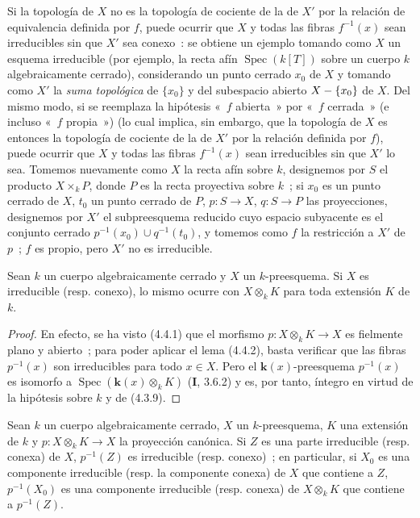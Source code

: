 \begin{remark}[4.4.3]
\label{IV.2.4.4.3-fr}
Si la topología de $X$ no es la topología de cociente de la de $X'$ por la
relación de equivalencia definida por $f$, puede ocurrir que $X$ y todas las
fibras $f^{-1}(x)$ sean irreducibles sin que $X'$ sea conexo~: se obtiene un
ejemplo tomando como $X$ un esquema irreducible (por ejemplo, la recta afín
$\operatorname{Spec}(k[T])$ sobre un cuerpo $k$ algebraicamente cerrado),
considerando un punto cerrado $x_0$ de $X$ y tomando como $X'$ la \emph{suma
topológica} de $\{x_0\}$ y del subespacio abierto $X-\{x_0\}$ de $X$. Del mismo
modo, si se reemplaza la hipótesis «~$f$ abierta~» por «~$f$ cerrada~» (e
incluso «~$f$ propia~») (lo cual implica, sin embargo, que la topología de $X$
es entonces la topología de cociente de la de $X'$ por la relación definida
por $f$), puede ocurrir que $X$ y todas las fibras $f^{-1}(x)$ sean
irreducibles sin que $X'$ lo sea. Tomemos nuevamente como $X$ la recta afín
sobre $k$, designemos por $S$ el producto $X\times_k P$, donde
$P$ es la recta proyectiva sobre $k$~; si $x_0$ es un punto cerrado de
$X$, $t_0$ un punto cerrado de $P$, $p:S\to X$, $q:S\to P$ las
proyecciones, designemos por $X'$ el subpreesquema reducido cuyo espacio
subyacente es el conjunto cerrado $p^{-1}(x_0)\cup q^{-1}(t_0)$, y tomemos como
$f$ la restricción a $X'$ de $p$~; $f$ es propio, pero $X'$ no es irreducible.
\end{remark}

\begin{theorem}[4.4.4]
\label{IV.2.4.4.4-fr}
Sean $k$ un cuerpo algebraicamente cerrado y $X$ un $k$-preesquema. Si $X$ es
irreducible \textup{(resp.} conexo\textup{)}, lo mismo ocurre con $X\otimes_k K$ para toda
extensión $K$ de $k$.
\end{theorem}

\begin{proof}
En efecto, se ha visto (4.4.1) que el morfismo $p:X\otimes_k K\to X$ es
fielmente plano y abierto~; para poder aplicar el lema (4.4.2), basta verificar
que las fibras $p^{-1}(x)$ son irreducibles para todo $x\in X$. Pero el
$\boldsymbol{k}(x)$-preesquema $p^{-1}(x)$ es isomorfo a
$\operatorname{Spec}(\boldsymbol{k}(x)\otimes_k K)$ (\textbf I, 3.6.2) y es, por tanto, íntegro en
virtud de la hipótesis sobre $k$ y de (4.3.9).
\end{proof}

\begin{corollary}[4.4.5]
\label{IV.2.4.4.5-fr}
Sean $k$ un cuerpo algebraicamente cerrado, $X$ un $k$-preesquema, $K$ una
extensión de $k$ y $p:X\otimes_k K\to X$ la proyección canónica. Si $Z$ es una
parte irreducible \textup{(resp.} conexa\textup{)} de $X$, $p^{-1}(Z)$ es irreducible \textup{(resp.}
conexo\textup{)}~; en particular, si $X_0$ es una componente irreducible \textup{(resp.} la
componente conexa\textup{)} de $X$ que contiene a $Z$, $p^{-1}(X_0)$ es una componente
irreducible \textup{(resp.} conexa\textup{)} de $X\otimes_k K$ que contiene a $p^{-1}(Z)$.
\end{corollary}

